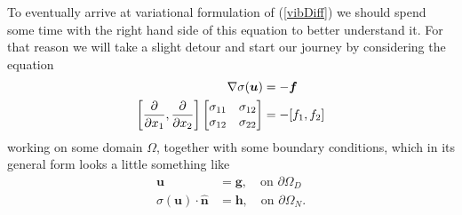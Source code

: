 \documentclass[paper=a4, fontsize=11pt]{scrartcl} %
\begin{document}
To eventually arrive at variational formulation of (\ref{vibDiff}) we should spend some time with the right hand side of this equation to better understand it. For that reason we will take a slight detour and start our journey by considering the equation
\begin{align}
\label{linEl}
\nabla \sigma(\boldsymbol{u}) &= - \boldsymbol{f} \\
\left[\frac{\partial}{\partial x_1},  \frac{\partial}{\partial x_2}\right]\begin{bmatrix}
\sigma_{11} & \sigma_{12} \\
\sigma_{12} & \sigma_{22}
\end{bmatrix} &= -[f_1,f_2] \notag
\end{align}
working on some domain $\Omega$,
together with some boundary conditions, which in its general form looks a little something like
\begin{align*}
\boldsymbol{u} &= \boldsymbol{g}, \quad \text{on } \partial \Omega_D \\
\sigma(\boldsymbol{u})\cdot \boldsymbol{\hat{n}} &= \boldsymbol{h}, \quad \text{on } \partial \Omega_N.
\end{align*}
\end{document}
